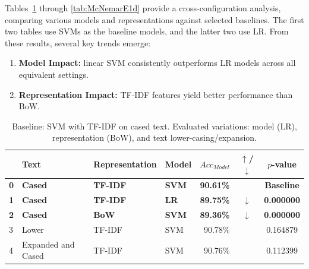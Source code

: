 \documentclass[a4paper,twoside,12pt]{book}
\newcommand{\logreg}{LR}
\newcommand{\mcnemarp}{p}
\begin{document}
Tables~\ref{tab:McNemarE1a} through \ref{tab:McNemarE1d} provide a cross-configuration analysis, comparing various models and representations against selected baselines. The first two tables use SVMs as the baseline models, and the latter two use \logreg{}. From these results, several key trends emerge:

\begin{enumerate}
	\item \textbf{Model Impact:} linear SVM consistently outperforms \logreg{} models across all equivalent settings.
	
	\item \textbf{Representation Impact:} TF-IDF features yield better performance than BoW.
\end{enumerate}


\begin{table}[tbp]%
	\centering
	\caption{McNemar test results analyzing the impact of casing, text expansion, representation, and model choice. Across all subtables, bold text indicates a statistically significant difference ($\mcnemarp < 0.05$) relative to the baseline, with arrows denoting the direction of the change in accuracy.}
	\label{tab:McNemarE1_all}
	\begin{subtable}{\textwidth}
		\centering
		\caption{Baseline: SVM with TF-IDF on cased text. Evaluated variations: model (\logreg{}), representation (BoW), and text lower-casing/expansion.}
		\label{tab:McNemarE1a}
		\begin{tabular}{llllrcc}
			\toprule
			& Text & Representation & Model & $Acc_{Model}$ & $\uparrow$/$\downarrow$ & $\mcnemarp$-value \\
			\midrule
			\textbf{0} & \textbf{Cased} & \textbf{TF-IDF} & \textbf{SVM} & \textbf{90.61\%} & \textbf{} & \textbf{Baseline} \\
			\textbf{1} & \textbf{Cased} & \textbf{TF-IDF} & \textbf{\logreg{}} & \textbf{89.75\%} & \textbf{$\downarrow$} & \textbf{0.000000} \\
			\textbf{2} & \textbf{Cased} & \textbf{BoW} & \textbf{SVM} & \textbf{89.36\%} & \textbf{$\downarrow$} & \textbf{0.000000} \\
			3 & Lower & TF-IDF & SVM & 90.78\% &  & 0.164879 \\
			4 & Expanded and Cased & TF-IDF & SVM & 90.76\% &  & 0.112399 \\
			\bottomrule
		\end{tabular}
	\end{subtable}
	
	\vspace{0.5em}
	

\end{table}
\end{document}
